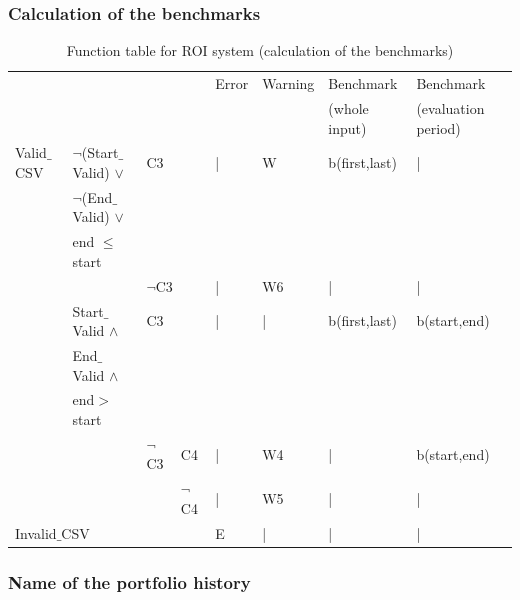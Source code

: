 \documentclass[runningheads,12pt]{article}
\begin{document}
\begin{landscape}
\subsubsection{Calculation of the benchmarks}

\begin{table}[H]
{
\centering

\begin{tabular}{|l|l|l|l||l|l|l|l|}
\hline
\multicolumn{4}{|c||}{} & Error & Warning & Benchmark & Benchmark\\ 
\multicolumn{4}{|l||}{}&&&(whole input) & (evaluation period)\\


\hline
Valid$\_$CSV & $\lnot$(Start$\_$Valid) $\vee$ & \multicolumn{2}{|l||}{C3} & | & W & b(first,last) & |\\ 
& $\lnot$(End$\_$Valid) $\vee$& \multicolumn{2}{|l||}{} &&& &\\
& end $\le$ start & \multicolumn{2}{|l||}{} & &&&\\

\cline{3-8}
& & \multicolumn{2}{|l||}{$\lnot$C3}& | & W6 & | & |\\ 

\cline{2-8}
& Start$\_$Valid  $\wedge$  & \multicolumn{2}{|l||}{C3} & | & | & b(first,last) & b(start,end)\\ 
& End$\_$Valid $\wedge$  & \multicolumn{2}{|l||}{} &&&&\\
& end$>$start   & \multicolumn{2}{|l||}{}&&&&\\

\cline{3-8}
&& $\lnot$C3 & C4 & | & W4 & | & b(start,end)\\

\cline{4-8}
&& & $\lnot$C4 & | & W5 & | & |\\

\hline
\multicolumn{4}{|l||}{Invalid$\_$CSV} & E & |& |& |\\ 

\hline
\end{tabular}

\caption{Function table for ROI system (calculation of the benchmarks)}
\label{table:ftable_bench}
}
\end{table}
\end{landscape}


\subsubsection{Name of the portfolio history}
\end{document}
